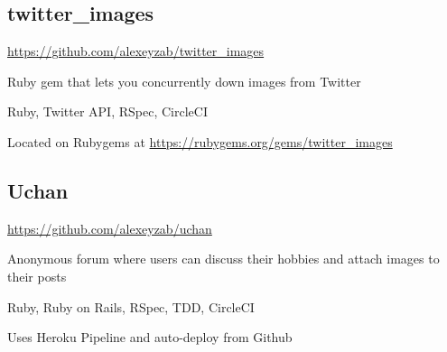 \documentclass[letterpaper]{article}
\renewenvironment{itemize}{
  \begin{list}{}{
    \setlength{\leftmargin}{1.5em}
  }
}{
  \end{list}
}
\begin{document}
\subsection*{twitter\_images}

\url{https://github.com/alexeyzab/twitter_images}

\begin{itemize}
\item Ruby gem that lets you concurrently down images from Twitter
\item Ruby, Twitter API, RSpec, CircleCI
\item Located on Rubygems at \url{https://rubygems.org/gems/twitter_images}
\end{itemize}

\subsection*{Uchan}

\url{https://github.com/alexeyzab/uchan}

\begin{itemize}
\item Anonymous forum where users can discuss their hobbies and attach images to their posts
\item Ruby, Ruby on Rails, RSpec, TDD, CircleCI
\item Uses Heroku Pipeline and auto-deploy from Github


\end{itemize}
\end{document}
